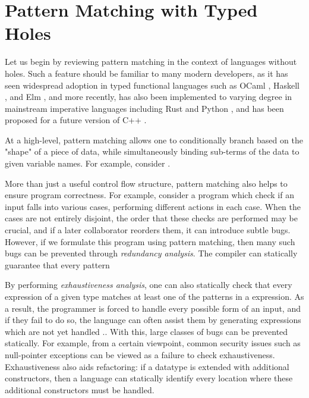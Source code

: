 \section{Pattern Matching with Typed Holes}

Let us begin by reviewing pattern matching in the context of languages without holes. Such a feature should be familiar to many modern developers, as it has seen widespread adoption in typed functional languages such as OCaml \cite{leroy:hal-00930213}, Haskell \cite{marlow2010haskell}, and Elm \cite{Elm}, and more recently, has also been implemented to varying degree in mainstream imperative languages including Rust \cite{10.5555/3271463} and Python \cite{pep634}, and has been proposed for a future version of C++ \cite{murzin2019pattern}.

At a high-level, pattern matching allows one to conditionally branch based on the "shape" of a piece of data, while simultaneously binding sub-terms of the data to given variable names. For example, consider . 

More than just a useful control flow structure, pattern matching also helps to ensure program correctness. For example, consider a program which check if an input falls into various cases, performing different actions in each case. When the cases are not entirely disjoint, the order that these checks are performed may be crucial, and if a later collaborator reorders them, it can introduce subtle bugs. However, if we formulate this program using pattern matching, then many such bugs can be prevented through \emph{redundancy analysis}. The compiler can statically guarantee that every pattern


By performing \emph{exhaustiveness analysis}, one can also statically check that every expression of a given type matches at least one of the patterns in a  expression. As a result, the programmer is forced to handle every possible form of an input, and if they fail to do so, the language can often assist them by generating expressions which are not yet handled \cite{Harper2012}.. With this, large classes of bugs can be prevented statically. For example, from a certain viewpoint, common security issues such as null-pointer exceptions can be viewed as a failure to check exhaustiveness. Exhaustiveness also aids refactoring: if a datatype is extended with additional constructors, then a language can statically identify every location where these additional constructors must be handled. 


